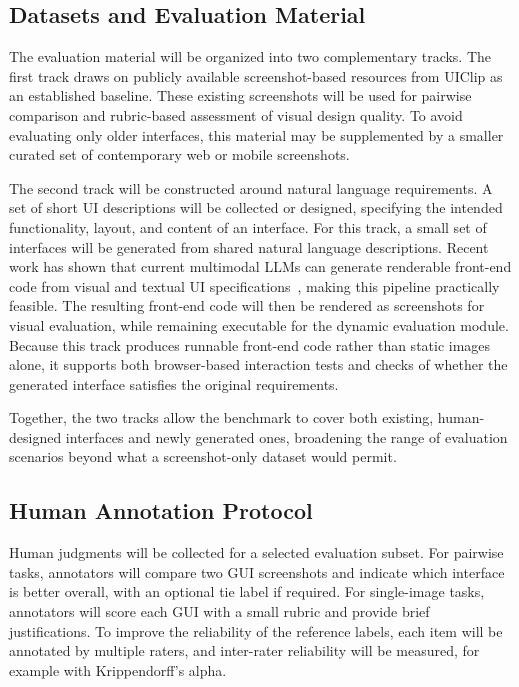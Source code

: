 \documentclass[pdflatex,sn-mathphys-num]{sn-jnl}
\begin{document}
\subsection{Datasets and Evaluation Material}

The evaluation material will be organized into two complementary tracks. The first
track draws on publicly available screenshot-based resources from UIClip as an
established baseline. These existing screenshots will be used for pairwise comparison
and rubric-based assessment of visual design quality. To avoid evaluating only older
interfaces, this material may be supplemented by a smaller curated set of contemporary
web or mobile screenshots.

The second track will be constructed around natural language requirements. A set of
short UI descriptions will be collected or designed, specifying the intended
functionality, layout, and content of an interface. For this track, a small set of
interfaces will be generated from shared natural language descriptions. Recent work
has shown that current multimodal LLMs can generate renderable front-end code from
visual and textual UI specifications~\cite{design2code}, making this pipeline
practically feasible. The resulting front-end code will then be rendered as screenshots
for visual evaluation, while remaining executable for the dynamic evaluation module.
Because this track produces runnable front-end code rather than static images alone,
it supports both browser-based interaction tests and checks of whether the generated
interface satisfies the original requirements.

Together, the two tracks allow the benchmark to cover both existing, human-designed
interfaces and newly generated ones, broadening the range of evaluation scenarios
beyond what a screenshot-only dataset would permit.

\subsection{Human Annotation Protocol}

Human judgments will be collected for a selected evaluation subset. For pairwise tasks,
annotators will compare two GUI screenshots and indicate which interface is better
overall, with an optional tie label if required. For single-image tasks, annotators
will score each GUI with a small rubric and provide brief justifications. To improve
the reliability of the reference labels, each item will be annotated by multiple
raters, and inter-rater reliability will be measured, for example with
Krippendorff's alpha.
\end{document}
